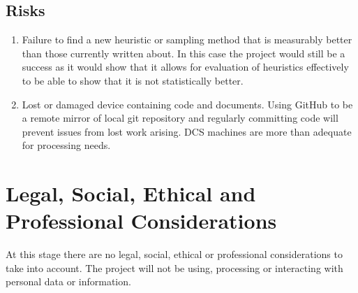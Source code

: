 \documentclass{article}
\begin{document}
\subsection{Risks}
\begin{enumerate}
	\item Failure to find a new heuristic or sampling method that is measurably better than those currently written about.
	      In this case the project would still be a success as it would show that it allows for evaluation of heuristics effectively to be able to show that it is not statistically better.

	\item Lost or damaged device containing code and documents.
	      Using GitHub to be a remote mirror of local git repository and regularly committing code will prevent issues from lost work arising.
	      DCS machines are more than adequate for processing needs.
\end{enumerate}

\section{Legal, Social, Ethical and Professional Considerations}

At this stage there are no legal, social, ethical or professional considerations to take into account.
The project will not be using, processing or interacting with personal data or information.

\newpage

{}
\end{document}
